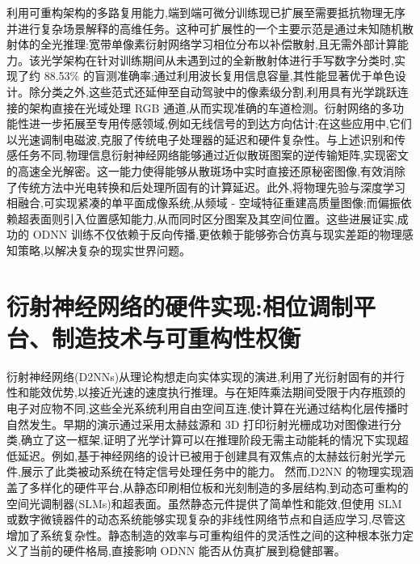 \documentclass[11pt]{article}
\begin{document}
利用可重构架构的多路复用能力,端到端可微分训练现已扩展至需要抵抗物理无序并进行复杂场景解释的高维任务。这种可扩展性的一个主要示范是通过未知随机散射体的全光推理:宽带单像素衍射网络学习相位分布以补偿散射,且无需外部计算能力。该光学架构在针对训练期间从未遇到过的全新散射体进行手写数字分类时,实现了约 88.53\% 的盲测准确率;通过利用波长复用信息容量,其性能显著优于单色设计。除分类之外,这些范式还延伸至自动驾驶中的像素级分割,利用具有光学跳跃连接的架构直接在光域处理 RGB 通道,从而实现准确的车道检测。衍射网络的多功能性进一步拓展至专用传感领域,例如无线信号的到达方向估计;在这些应用中,它们以光速调制电磁波,克服了传统电子处理器的延迟和硬件复杂性。与上述识别和传感任务不同,物理信息衍射神经网络能够通过近似散斑图案的逆传输矩阵,实现密文的高速全光解密。这一能力使得能够从散斑场中实时直接还原秘密图像,有效消除了传统方法中光电转换和后处理所固有的计算延迟。此外,将物理先验与深度学习相融合,可实现紧凑的单平面成像系统,从频域 - 空域特征重建高质量图像;而偏振依赖超表面则引入位置感知能力,从而同时区分图案及其空间位置。这些进展证实,成功的 ODNN 训练不仅依赖于反向传播,更依赖于能够弥合仿真与现实差距的物理感知策略,以解决复杂的现实世界问题。\citep{doi_10_1038_s41377_023_01116_3_aba67a18} \citep{doi_10_48550_arxiv_2602_07717_16cb1c7a} \citep{doi_10_1038_s41377_024_01511_4_2538a27d} \citep{doi_10_1364_oe_579297_3ffb4db0} \citep{doi_10_1117_12_3086084_f1b734fa} \citep{doi_10_1117_1_apn_5_1_016010_3e30c230}

\section{衍射神经网络的硬件实现:相位调制平台、制造技术与可重构性权衡}\label{ux884dux5c04ux795eux7ecfux7f51ux7edcux7684ux786cux4ef6ux5b9eux73b0ux76f8ux4f4dux8c03ux5236ux5e73ux53f0ux5236ux9020ux6280ux672fux4e0eux53efux91cdux6784ux6027ux6743ux8861}

衍射神经网络(D2NNs)从理论构想走向实体实现的演进,利用了光衍射固有的并行性和能效优势,以接近光速的速度执行推理。与在矩阵乘法期间受限于内存瓶颈的电子对应物不同,这些全光系统利用自由空间互连,使计算在光通过结构化层传播时自然发生。早期的演示通过采用太赫兹源和 3D 打印衍射光栅成功对图像进行分类,确立了这一框架,证明了光学计算可以在推理阶段无需主动能耗的情况下实现超低延迟。例如,基于神经网络的设计已被用于创建具有双焦点的太赫兹衍射光学元件,展示了此类被动系统在特定信号处理任务中的能力。 \citep{doi_10_1109_tthz_2023_3344020_a0a550ba} 然而,D2NN 的物理实现涵盖了多样化的硬件平台,从静态印刷相位板和光刻制造的多层结构,到动态可重构的空间光调制器(SLMs)和超表面。虽然静态元件提供了简单性和能效,但使用 SLM 或数字微镜器件的动态系统能够实现复杂的非线性网络节点和自适应学习,尽管这增加了系统复杂性。静态制造的效率与可重构组件的灵活性之间的这种根本张力定义了当前的硬件格局,直接影响 ODNN 能否从仿真扩展到稳健部署。 \citep{doi_10_1155_2021_6667495_60f04b14} \citep{doi_10_1364_josab_497148_b087424b}
\end{document}
